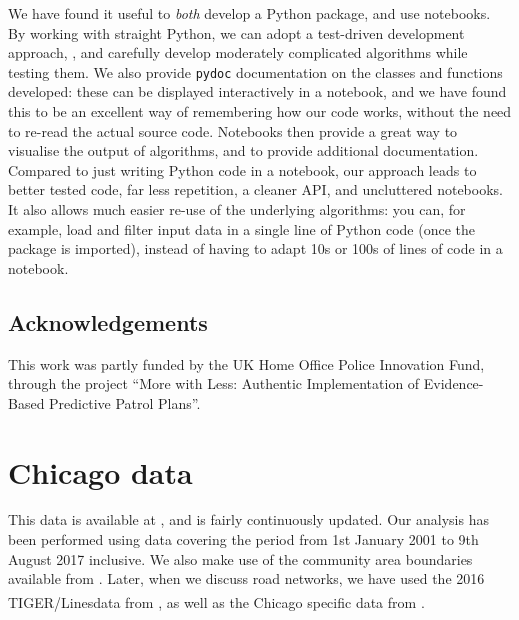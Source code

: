 \documentclass[twoside,a4paper,twocolumn,10pt]{article}
\theoremstyle{plain}
\theoremstyle{definition}
\newcommand{\regsym}{\textsuperscript{\textregistered}}
\begin{document}
We have found it useful to \emph{both} develop a Python package, and use notebooks.
By working with straight Python, we can adopt a test-driven development approach, \cite{beck},
and carefully develop moderately complicated algorithms while testing them.  We also provide
\texttt{pydoc} documentation on the classes and functions developed: these can be displayed
interactively in a notebook, and we have found this to be an excellent way of remembering
how our code works, without the need to re-read the actual source code.  Notebooks then provide
a great way to visualise the output of algorithms, and to provide additional documentation.
Compared to just writing Python code in a notebook, our approach leads to better tested code,
far less repetition, a cleaner API, and uncluttered notebooks.  It also allows much easier
re-use of the underlying algorithms: you can, for example, load and filter input data in a
single line of Python code (once the package is imported), instead of having to adapt 10s
or 100s of lines of code in a notebook.



\subsection{Acknowledgements}

This work was partly funded by the UK Home Office Police Innovation Fund, through the
project ``More with Less: Authentic Implementation of Evidence-Based Predictive
Patrol Plans''.



\section{Chicago data}

This data is available at \cite{cdata}, and is fairly continuously updated.  Our analysis has been
performed using data covering the period from 1st January 2001 to 9th August 2017 inclusive.
We also make use of the community area boundaries available from \cite{cgeo}.  Later, when we discuss
road networks, we have used the 2016 TIGER/Lines\regsym data from \cite{tiger}, as well
as the Chicago specific data from \cite{cstreets}.
\end{document}
